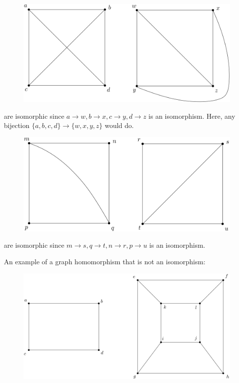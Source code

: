 \documentclass[11pt]{article}
\begin{document}
    \begin{figure}[H]
        \centering
        \includegraphics[scale=0.2]{iso1.png}
    \end{figure}

    are isomorphic since \(a \rightarrow w, b \rightarrow x, c \rightarrow y, d \rightarrow z\) is an isomorphism. Here, any bijection \(\{a,b,c,d\} \rightarrow \{w,x,y,z\}\) would do.

    \begin{figure}[H]
        \centering
        \includegraphics[scale=0.2]{iso2.png}
    \end{figure}

    are isomorphic since \(m \rightarrow s, q \rightarrow t, n \rightarrow r, p \rightarrow u\) is an isomorphism.

    An example of a graph homomorphism that is not an isomorphism:
    \begin{figure}[H]
        \centering
        \includegraphics[scale=0.2]{homo1.png}
    \end{figure}
\end{document}
